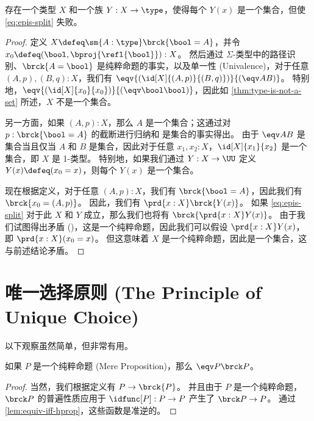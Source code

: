 \begin{lem}\label{thm:no-higher-ac}
存在一个类型 $X$ 和一个族 $Y:X\to \type$，使得每个 $Y(x)$ 是一个集合，但使 \eqref{eq:epis-split} 失败。
\end{lem}
\begin{proof}
  定义 $X\defeq \sm{A:\type} \brck{\bool = A}$，并令 $x_0 \defeq (\bool, \bproj{\refl{\bool}}) : X$。
  然后通过 $\Sigma$-类型中的路径识别、$\brck{A=\bool}$ 是纯粹命题的事实，以及单一性 (Univalence)，对于任意 $(A,p),(B,q):X$，我们有 $\eqv{(\id[X]{(A,p)}{(B,q)})}{(\eqv AB)}$。
  特别地，$\eqv{(\id[X]{x_0}{x_0})}{(\eqv \bool\bool)}$，因此如 \cref{thm:type-is-not-a-set} 所述，$X$ 不是一个集合。

  另一方面，如果 $(A,p):X$，那么 $A$ 是一个集合；这通过对 $p:\brck{\bool=A}$ 的截断进行归纳和 \bool 是集合的事实得出。
  由于 $\eqv A B$ 是集合当且仅当 $A$ 和 $B$ 是集合，因此对于任意 $x_1,x_2:X$，$\id[X]{x_1}{x_2}$ 是一个集合，即 $X$ 是 1-类型。
  特别地，如果我们通过 $Y:X\to\UU$ 定义 $Y(x) \defeq (x_0=x)$，则每个 $Y(x)$ 是一个集合。

  现在根据定义，对于任意 $(A,p):X$，我们有 $\brck{\bool=A}$，因此我们有 $\brck{x_0 = (A,p)}$。
  因此，我们有 $\prd{x:X} \brck{Y(x)}$。
  如果 \eqref{eq:epis-split} 对于此 $X$ 和 $Y$ 成立，那么我们也将有 $\brck{\prd{x:X} Y(x)}$。
  由于我们试图得出矛盾 (\emptyt)，这是一个纯粹命题，因此我们可以假设 $\prd{x:X} Y(x)$，即 $\prd{x:X} (x_0=x)$。
  但这意味着 $X$ 是一个纯粹命题，因此是一个集合，这与前述结论矛盾。
\end{proof}

%
%

\section{唯一选择原则 (The Principle of Unique Choice)}
\label{sec:unique-choice}

%
%

以下观察虽然简单，但非常有用。

\begin{lem}\label{thm:prop-equiv-trunc}
如果 $P$ 是一个纯粹命题 (Mere Proposition)，那么 $\eqv P {\brck P}$。
\end{lem}
\begin{proof}
  当然，我们根据定义有 $P\to \brck{P}$。
  并且由于 $P$ 是一个纯粹命题，$\brck P$ 的普遍性质应用于 $\idfunc[P] :P\to P$ 产生了 $\brck P \to P$。
  通过 \cref{lem:equiv-iff-hprop}，这些函数是准逆的。
\end{proof}

